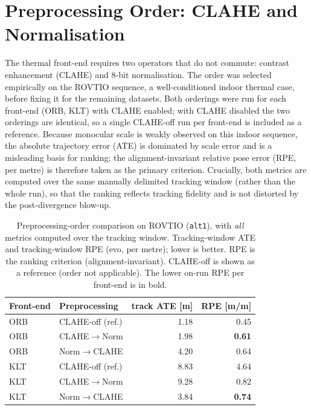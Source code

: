 \newpage

\section{Preprocessing Order: CLAHE and Normalisation}
\label{sec:r_preproc}
The thermal front-end requires two operators that do not commute: contrast enhancement (CLAHE) and 8-bit normalisation. The order was selected empirically on the ROVTIO sequence, a well-conditioned indoor thermal case, before fixing it for the remaining datasets. Both orderings were run for each front-end (ORB, KLT) with CLAHE enabled; with CLAHE disabled the two orderings are identical, so a single CLAHE-off run per front-end is included as a reference. Because monocular scale is weakly observed on this indoor sequence, the absolute trajectory error (ATE) is dominated by scale error and is a misleading basis for ranking; the alignment-invariant relative pose error (RPE, per metre) is therefore taken as the primary criterion. Crucially, both metrics are computed over the same manually delimited tracking window (rather than the whole run), so that the ranking reflects tracking fidelity and is not distorted by the post-divergence blow-up.

\begin{table}[htbp]
\centering
\caption{Preprocessing-order comparison on ROVTIO (\texttt{alt1}), with \emph{all} metrics computed over the tracking window. Tracking-window ATE and tracking-window RPE (evo, per metre); lower is better. RPE is the ranking criterion (alignment-invariant). CLAHE-off is shown as a reference (order not applicable). The lower on-run RPE per front-end is in bold.}
\label{tab:r_preproc_rovtio}
\begin{tabular}{llrr}
\toprule
Front-end & Preprocessing & track ATE [m] & RPE [m/m] \\
\midrule
ORB & CLAHE-off (ref.)  & 1.18 & 0.45 \\
ORB & CLAHE$\rightarrow$Norm & 1.98 & \textbf{0.61} \\
ORB & Norm$\rightarrow$CLAHE & 4.20 & 0.64 \\
\midrule
KLT & CLAHE-off (ref.)  & 8.83 & 4.64 \\
KLT & CLAHE$\rightarrow$Norm & 9.28 & 0.82 \\
KLT & Norm$\rightarrow$CLAHE & 3.84 & \textbf{0.74} \\
\bottomrule
\end{tabular}
\end{table}


